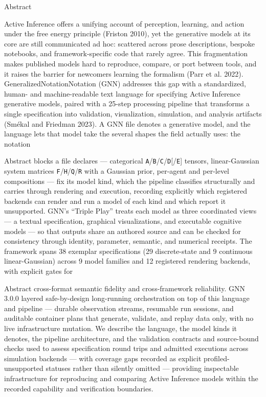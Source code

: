 \documentclass[
  ignorenonframetext,
]{beamer}
\begin{document}
\begin{frame}{Abstract}

Active Inference offers a unifying account of perception, learning, and
action under the free energy principle (Friston 2010), yet the
generative models at its core are still communicated ad hoc: scattered
across prose descriptions, bespoke notebooks, and framework-specific
code that rarely agree. This fragmentation makes published models hard
to reproduce, compare, or port between tools, and it raises the barrier
for newcomers learning the formalism (Parr et al. 2022).
GeneralizedNotationNotation (GNN) addresses this gap with a
standardized, human- and machine-readable text language for specifying
Active Inference generative models, paired with a 25-step processing
pipeline that transforms a single specification into validation,
visualization, simulation, and analysis artifacts (Smékal and Friedman
2023). A GNN file denotes a generative model, and the language lets that
model take the several shapes the field actually uses: the notation
\end{frame}

\begin{frame}{Abstract}
blocks a file declares --- categorical
\texttt{A}/\texttt{B}/\texttt{C}/\texttt{D}{[}/\texttt{E}{]} tensors,
linear-Gaussian system matrices
\texttt{F}/\texttt{H}/\texttt{Q}/\texttt{R} with a Gaussian prior,
per-agent and per-level compositions --- fix its model kind, which the
pipeline classifies structurally and carries through rendering and
execution, recording explicitly which registered backends can render and
run a model of each kind and which report it unsupported. GNN's ``Triple
Play'' treats each model as three coordinated views --- a textual
specification, graphical visualizations, and executable cognitive models
--- so that outputs share an authored source and can be checked for
consistency through identity, parameter, semantic, and numerical
receipts. The framework spans 38 exemplar specifications (29
discrete-state and 9 continuous linear-Gaussian) across 9 model families
and 12 registered rendering backends, with explicit gates for
\end{frame}

\begin{frame}{Abstract}
cross-format semantic fidelity and cross-framework reliability. GNN
3.0.0 layered safe-by-design long-running orchestration on top of this
language and pipeline --- durable observation streams, resumable run
sessions, and auditable container plans that generate, validate, and
replay data only, with no live infrastructure mutation. We describe the
language, the model kinds it denotes, the pipeline architecture, and the
validation contracts and source-bound checks used to assess
specification round trips and admitted executions across simulation
backends --- with coverage gaps recorded as explicit
profiled-unsupported statuses rather than silently omitted --- providing
inspectable infrastructure for reproducing and comparing Active
Inference models within the recorded capability and verification
boundaries.
\end{frame}
\end{document}
